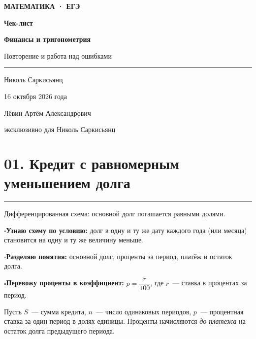 \documentclass[a4paper,12pt]{article}
\newcommand{\sectionnote}[1]{{\small\color{softgray}#1\par}}
\newcommand{\criterion}[1]{\textcolor{darkaccent}{\bfseries #1}}
\newcommand{\checkitem}[1]{\par\noindent\hspace{-1pt}\textcolor{accent}{\(\square\)}\enspace #1\par}
\newcommand{\lessonsection}[1]{\Needspace{5\baselineskip}\section*{\color{darkaccent}#1}\vspace{-5pt}\noindent\textcolor{accent}{\rule{25mm}{0.7pt}}\par\vspace{1pt}}
\begin{document}
\thispagestyle{empty}
\begin{titlepage}
\begin{center}
\vspace*{29mm}
{\large\color{darkaccent}\bfseries МАТЕМАТИКА · ЕГЭ}\par
\vspace{28mm}
{\Huge\bfseries Чек-лист}\par
\vspace{9mm}
{\LARGE\color{darkaccent}\bfseries Финансы и тригонометрия}\par
\vspace{4mm}
{\Large Повторение и работа над ошибками}\par
\vspace{21mm}
\textcolor{accent}{\rule{34mm}{0.7pt}}\par
\vspace{15mm}
{\large Николь Саркисьянц}\par
\vspace{6mm}
{\large 16 октября 2026 года}\par
\vfill
{\small\color{textgray}Лёвин Артём Александрович}\par
{\small\color{textgray}эксклюзивно для Николь Саркисьянц}\par
\vspace{17mm}
\end{center}
\end{titlepage}

\lessonsection{01. Кредит с равномерным уменьшением долга}
\sectionnote{Дифференцированная схема: основной долг погашается равными долями.}

\checkitem{\criterion{Узнаю схему по условию:} долг в одну и ту же дату каждого года (или месяца) становится на одну и ту же величину меньше.}
\checkitem{\criterion{Разделяю понятия:} основной долг, проценты за период, платёж и остаток долга.}
\checkitem{\criterion{Перевожу проценты в коэффициент:} \(p=\dfrac r{100}\), где \(r\)~--- ставка в процентах за период.}

Пусть \(S\)~--- сумма кредита, \(n\)~--- число одинаковых периодов, \(p\)~--- процентная ставка за один период в долях единицы. Проценты начисляются \emph{до платежа} на остаток долга предыдущего периода.
\end{document}
